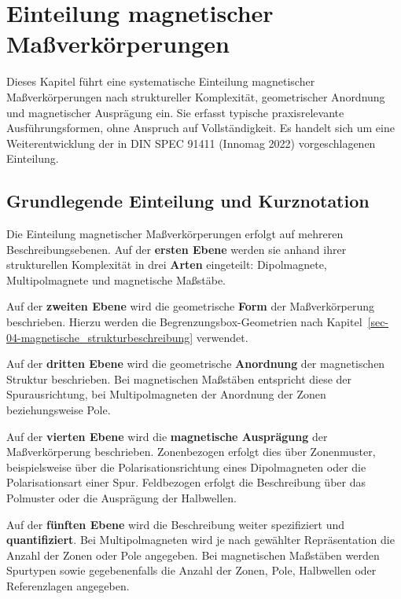 \documentclass[
  ngerman,
  a4paper,
  twoside]{scrbook}
\begin{document}

\chapter{Einteilung magnetischer Maßverkörperungen}\label{sec-07}

Dieses Kapitel führt eine systematische Einteilung magnetischer
Maßverkörperungen nach struktureller Komplexität, geometrischer
Anordnung und magnetischer Ausprägung ein. Sie erfasst typische
praxisrelevante Ausführungsformen, ohne Anspruch auf Vollständigkeit. Es
handelt sich um eine Weiterentwicklung der in DIN SPEC 91411 (Innomag
2022) vorgeschlagenen Einteilung.

\section{Grundlegende Einteilung und
Kurznotation}\label{sec-07-grundlegende-einteilung}

Die Einteilung magnetischer Maßverkörperungen erfolgt auf mehreren
Beschreibungsebenen. Auf der \textbf{ersten Ebene} werden sie anhand
ihrer strukturellen Komplexität in drei \textbf{Arten} eingeteilt:
Dipolmagnete, Multipolmagnete und magnetische Maßstäbe.

Auf der \textbf{zweiten Ebene} wird die geometrische \textbf{Form} der
Maßverkörperung beschrieben. Hierzu werden die Begrenzungsbox-Geometrien
nach Kapitel~\ref{sec-04-magnetische_strukturbeschreibung} verwendet.

Auf der \textbf{dritten Ebene} wird die geometrische \textbf{Anordnung}
der magnetischen Struktur beschrieben. Bei magnetischen Maßstäben
entspricht diese der Spurausrichtung, bei Multipolmagneten der Anordnung
der Zonen beziehungsweise Pole.

Auf der \textbf{vierten Ebene} wird die \textbf{magnetische Ausprägung}
der Maßverkörperung beschrieben. Zonenbezogen erfolgt dies über
Zonenmuster, beispielsweise über die Polarisationsrichtung eines
Dipolmagneten oder die Polarisationsart einer Spur. Feldbezogen erfolgt
die Beschreibung über das Polmuster oder die Ausprägung der Halbwellen.

Auf der \textbf{fünften Ebene} wird die Beschreibung weiter spezifiziert
und \textbf{quantifiziert}. Bei Multipolmagneten wird je nach gewählter
Repräsentation die Anzahl der Zonen oder Pole angegeben. Bei
magnetischen Maßstäben werden Spurtypen sowie gegebenenfalls die Anzahl
der Zonen, Pole, Halbwellen oder Referenzlagen angegeben.
\end{document}
